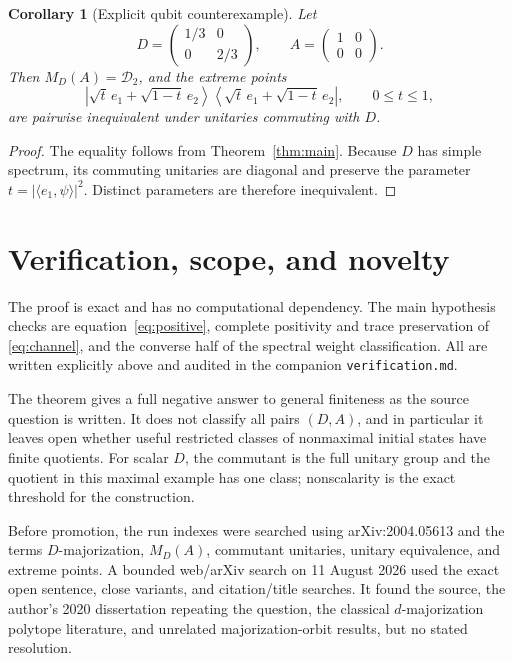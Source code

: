 \documentclass[11pt]{article}
\newcommand{\Dens}{\mathcal D}
\newtheorem{corollary}{Corollary}
\begin{document}
\begin{corollary}[Explicit qubit counterexample]\label{cor:qubit}
Let
\[
 D=\begin{pmatrix}1/3&0\\0&2/3\end{pmatrix},
 \qquad
 A=\begin{pmatrix}1&0\\0&0\end{pmatrix}.
\]
Then \(M_D(A)=\Dens_2\), and the extreme points
\[
 \left|\sqrt t\,e_1+\sqrt{1-t}\,e_2\right\rangle
 \left\langle\sqrt t\,e_1+\sqrt{1-t}\,e_2\right|,
 \qquad 0\le t\le1,
\]
are pairwise inequivalent under unitaries commuting with \(D\).
\end{corollary}

\begin{proof}
The equality follows from Theorem~\ref{thm:main}.  Because \(D\) has simple
spectrum, its commuting unitaries are diagonal and preserve the parameter
\(t=|\langle e_1,\psi\rangle|^2\).  Distinct parameters are therefore
inequivalent.
\end{proof}

\section{Verification, scope, and novelty}

The proof is exact and has no computational dependency.  The main hypothesis
checks are equation~\eqref{eq:positive}, complete positivity and trace
preservation of \eqref{eq:channel}, and the converse half of the spectral
weight classification.  All are written explicitly above and audited in the
companion \texttt{verification.md}.

The theorem gives a full negative answer to general finiteness as the source
question is written.  It does not classify all pairs \((D,A)\), and in
particular it leaves open whether useful restricted classes of nonmaximal
initial states have finite quotients.  For scalar \(D\), the commutant is the
full unitary group and the quotient in this maximal example has one class;
nonscalarity is the exact threshold for the construction.

Before promotion, the run indexes were searched using arXiv:2004.05613 and
the terms \(D\)-majorization, \(M_D(A)\), commutant unitaries, unitary
equivalence, and extreme points.  A bounded web/arXiv search on 11 August 2026
used the exact open sentence, close variants, and citation/title searches.
It found the source, the author's 2020 dissertation repeating the question,
the classical \(d\)-majorization polytope literature, and unrelated
majorization-orbit results, but no stated resolution.
\end{document}
